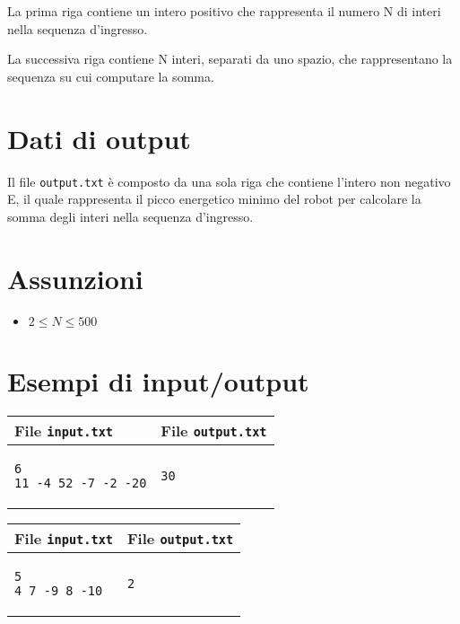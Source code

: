\documentclass[a4paper,11pt]{article}
\begin{document}
La prima riga contiene un intero positivo che rappresenta il numero N
di interi nella sequenza d'ingresso.

La successiva riga contiene N interi, separati da uno spazio, che
rappresentano la sequenza su cui computare la somma.


\section*{Dati di output}
  Il file \texttt{output.txt} è composto da una sola riga
che contiene l'intero non negativo E, il quale rappresenta il picco
energetico minimo del robot per calcolare la somma degli interi nella
sequenza d'ingresso.

  \section*{Assunzioni}
  \begin{itemize}
  
    \item $ 2 ≤ N ≤ 500 $
  \end{itemize}

\section*{Esempi di input/output}

  
    \noindent
    \begin{tabular}{p{11cm}|p{5cm}}
    \toprule
    \textbf{File \texttt{input.txt}}
    & \textbf{File \texttt{output.txt}}
    \\
    \midrule
    \scriptsize
    \begin{verbatim}
6
11 -4 52 -7 -2 -20
\end{verbatim}
    &
    \scriptsize
    \begin{verbatim}
30
\end{verbatim}
    \\
    \bottomrule
    \end{tabular}
  
    \noindent
    \begin{tabular}{p{11cm}|p{5cm}}
    \toprule
    \textbf{File \texttt{input.txt}}
    & \textbf{File \texttt{output.txt}}
    \\
    \midrule
    \scriptsize
    \begin{verbatim}
5
4 7 -9 8 -10
\end{verbatim}
    &
    \scriptsize
    \begin{verbatim}
2
\end{verbatim}
    \\
    \bottomrule
    \end{tabular}
  
\end{document}
